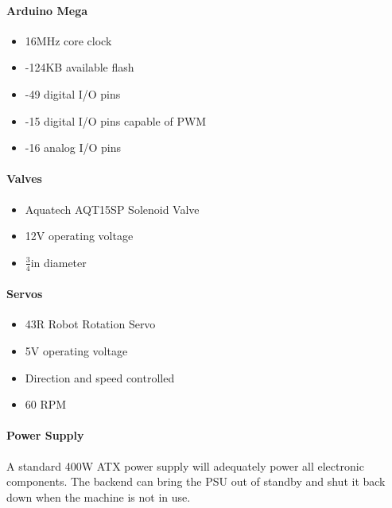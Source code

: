 {	    \paragraph{Arduino Mega}
        \begin{itemize}
		    \item 16MHz core clock
		    \item-124KB available flash
		    \item-49 digital I/O pins
		    \item-15 digital I/O pins capable of PWM
		    \item-16 analog I/O pins
        \end{itemize}

	    \paragraph{Valves}
        \begin{itemize}
		    \item Aquatech AQT15SP Solenoid Valve
		    \item 12V operating voltage
		    \item $\frac{3}{4}$in diameter
        \end{itemize}

	    \paragraph{Servos}
        \begin{itemize}
		    \item 43R Robot Rotation Servo
		    \item 5V operating voltage
		    \item Direction and speed controlled
		    \item 60 RPM
        \end{itemize}

        \paragraph{Power Supply} 
	    A standard 400W ATX power supply will adequately power all 
        electronic components. The backend can bring the PSU out of standby 
        and shut it back down when the machine is not in use.

}
                
